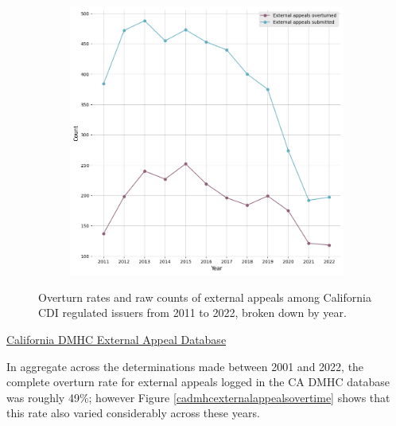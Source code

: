 \documentclass[12pt, a4paper,twoside]{report}
\theoremstyle{plain} %
\theoremstyle{definition} %
\theoremstyle{remark} %
\numberwithin{equation}{chapter}
\begin{document}
\begin{figure}[h!]
\begin{subfigure}[b]{0.49\textwidth}
				\includegraphics[width=\textwidth]{images/ca_doi_external_appeals/external_appeals_by_year.png}
			\end{subfigure}
			\caption{Overturn rates and raw counts of external appeals among California CDI regulated issuers from 2011 to 2022, broken down by year.}
			\label{cacdiexternalappealsovertime}
		\end{figure}
		
		
		\underline{California DMHC External Appeal Database}
		
		In aggregate across the determinations made between 2001 and 2022, the complete overturn rate for external appeals logged in the CA DMHC database was roughly 49\%; however Figure \ref{cadmhcexternalappealsovertime} shows that this rate also varied considerably across these years.
		
\end{document}

